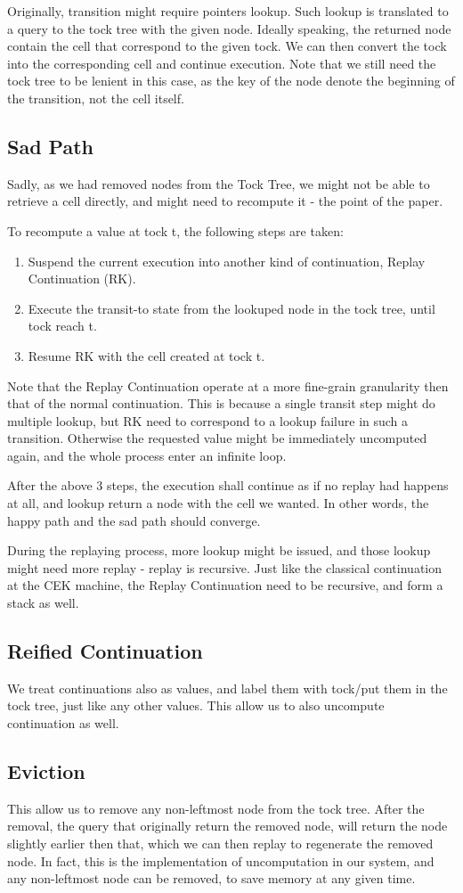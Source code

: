Originally, transition might require pointers lookup. Such lookup is translated to a query to the tock tree with the given node. Ideally speaking, the returned node contain the cell that correspond to the given tock. We can then convert the tock into the corresponding cell and continue execution. Note that we still need the tock tree to be lenient in this case, as the key of the node denote the beginning of the transition, not the cell itself.
\subsection{Sad Path}
Sadly, as we had removed nodes from the Tock Tree, we might not be able to retrieve a cell directly, and might need to recompute it - the point of the paper.

To recompute a value at tock t, the following steps are taken:
\begin{enumerate}
	\item Suspend the current execution into another kind of continuation, Replay Continuation (RK).
	\item Execute the transit-to state from the lookuped node in the tock tree, until tock reach t.
	\item Resume RK with the cell created at tock t.
\end{enumerate}
Note that the Replay Continuation operate at a more fine-grain granularity then that of the normal continuation. This is because a single transit step might do multiple lookup, but RK need to correspond to a lookup failure in such a transition. Otherwise the requested value might be immediately uncomputed again, and the whole process enter an infinite loop.

After the above 3 steps, the execution shall continue as if no replay had happens at all, and lookup return a node with the cell we wanted. In other words, the happy path and the sad path should converge.

During the replaying process, more lookup might be issued, and those lookup might need more replay - replay is recursive. Just like the classical continuation at the CEK machine, the Replay Continuation need to be recursive, and form a stack as well.

\subsection{Reified Continuation}
We treat continuations also as values, and label them with tock/put them in the tock tree, just like any other values. This allow us to also uncompute continuation as well.

\subsection{Eviction}

This allow us to remove any non-leftmost node from the tock tree. After the removal, the query that originally return the removed node, will return the node slightly earlier then that, which we can then replay to regenerate the removed node. In fact, this is the implementation of uncomputation in our system, and any non-leftmost node can be removed, to save memory at any given time.